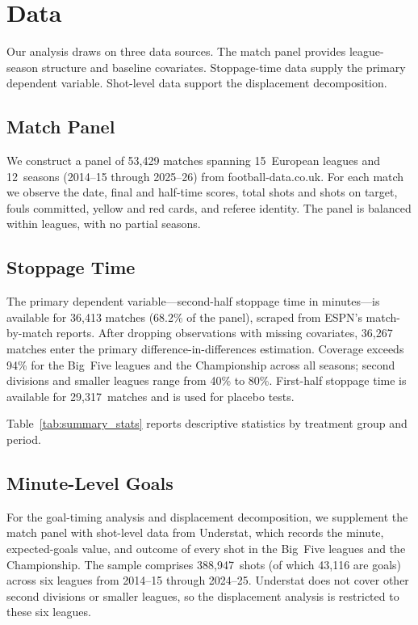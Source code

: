 
\section{Data}
\label{sec:data}

Our analysis draws on three data sources. The match panel provides
league-season structure and baseline covariates. Stoppage-time data
supply the primary dependent variable. Shot-level data support the
displacement decomposition.

\subsection{Match Panel}

We construct a panel of 53,429 matches spanning 15~European leagues
and 12~seasons (2014--15 through 2025--26) from football-data.co.uk.
For each match we observe the date, final and half-time scores, total
shots and shots on target, fouls committed, yellow and red cards, and
referee identity. The panel is balanced within leagues, with no partial
seasons.

\subsection{Stoppage Time}

The primary dependent variable---second-half stoppage time in
minutes---is available for 36,413 matches (68.2\% of the panel),
scraped from ESPN's match-by-match reports. After dropping observations
with missing covariates, 36,267 matches enter the primary
difference-in-differences estimation. Coverage exceeds 94\% for the
Big~Five leagues and the Championship across all seasons; second
divisions and smaller leagues range from 40\% to 80\%.
First-half stoppage time is available for 29,317~matches and is used
for placebo tests.

Table~\ref{tab:summary_stats} reports descriptive statistics by
treatment group and period.



\subsection{Minute-Level Goals}

For the goal-timing analysis and displacement decomposition, we
supplement the match panel with shot-level data from Understat, which
records the minute, expected-goals value, and outcome of every shot
in the Big~Five leagues and the Championship. The sample comprises
388,947~shots (of which 43,116 are goals) across six leagues from
2014--15 through 2024--25. Understat does not cover other second
divisions or smaller leagues, so the displacement analysis is
restricted to these six leagues.
